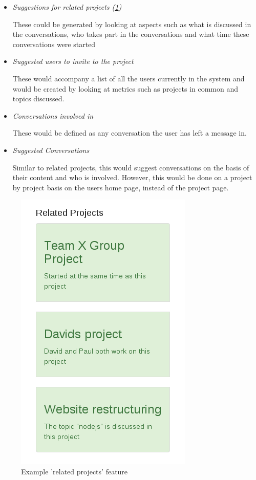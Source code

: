 \documentclass{l4proj}
\begin{document}
\begin{itemize}
\item \textit{Suggestions for related projects (\ref{fig:5})}
\par These could be generated by looking at aspects such as what is discussed in the conversations, who takes part in the conversations and what time these conversations were started
\item \textit{Suggested users to invite to the project}
\par These would accompany a list of all the users currently in the system and would be created by looking at metrics such as projects in common and topics discussed.
\item \textit{Conversations involved in}
\par These would be defined as any conversation the user has left a message in.
\item \textit{Suggested Conversations}
\par Similar to related projects, this would suggest conversations on the basis of their content and who is involved.  However, this would be done on a project by project basis on the users home page, instead of the project page.
\end{itemize}

\begin{figure}[h]
\includegraphics[scale = 0.8]{RelatedProj.png}
\centering
\caption{Example 'related projects' feature}
\label{fig:5}
\end{figure}
\end{document}
